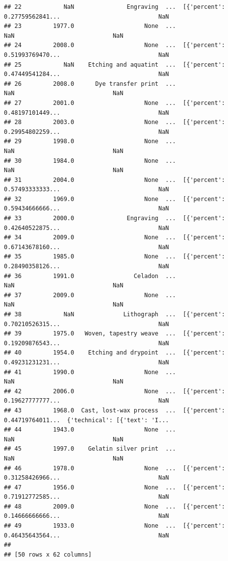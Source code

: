 \documentclass[]{book}
\begin{document}
\begin{verbatim}
## 22            NaN               Engraving  ...  [{'percent': 0.27759562841...                            NaN
## 23         1977.0                    None  ...                            NaN                            NaN
## 24         2008.0                    None  ...  [{'percent': 0.51993769470...                            NaN
## 25            NaN    Etching and aquatint  ...  [{'percent': 0.47449541284...                            NaN
## 26         2008.0      Dye transfer print  ...                            NaN                            NaN
## 27         2001.0                    None  ...  [{'percent': 0.48197101449...                            NaN
## 28         2003.0                    None  ...  [{'percent': 0.29954802259...                            NaN
## 29         1998.0                    None  ...                            NaN                            NaN
## 30         1984.0                    None  ...                            NaN                            NaN
## 31         2004.0                    None  ...  [{'percent': 0.57493333333...                            NaN
## 32         1969.0                    None  ...  [{'percent': 0.59434666666...                            NaN
## 33         2000.0               Engraving  ...  [{'percent': 0.42640522875...                            NaN
## 34         2009.0                    None  ...  [{'percent': 0.67143678160...                            NaN
## 35         1985.0                    None  ...  [{'percent': 0.28490358126...                            NaN
## 36         1991.0                 Celadon  ...                            NaN                            NaN
## 37         2009.0                    None  ...                            NaN                            NaN
## 38            NaN              Lithograph  ...  [{'percent': 0.70210526315...                            NaN
## 39         1975.0   Woven, tapestry weave  ...  [{'percent': 0.19209876543...                            NaN
## 40         1954.0    Etching and drypoint  ...  [{'percent': 0.49231231231...                            NaN
## 41         1990.0                    None  ...                            NaN                            NaN
## 42         2006.0                    None  ...  [{'percent': 0.19627777777...                            NaN
## 43         1968.0  Cast, lost-wax process  ...  [{'percent': 0.44719764011...  {'technical': [{'text': 'I...
## 44         1943.0                    None  ...                            NaN                            NaN
## 45         1997.0    Gelatin silver print  ...                            NaN                            NaN
## 46         1978.0                    None  ...  [{'percent': 0.31258426966...                            NaN
## 47         1956.0                    None  ...  [{'percent': 0.71912772585...                            NaN
## 48         2009.0                    None  ...  [{'percent': 0.14666666666...                            NaN
## 49         1933.0                    None  ...  [{'percent': 0.46435643564...                            NaN
## 
## [50 rows x 62 columns]
\end{verbatim}
\end{document}
